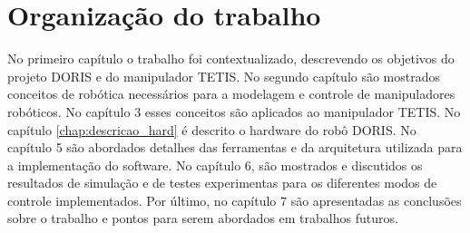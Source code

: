 \section{Organização do trabalho}

No primeiro capítulo o trabalho foi contextualizado, descrevendo os objetivos do projeto DORIS e do manipulador TETIS. No segundo capítulo são mostrados conceitos de robótica necessários para a modelagem e controle de manipuladores robóticos. No capítulo 3 esses conceitos são aplicados ao manipulador TETIS.
No capítulo \ref{chap:descricao_hard} é descrito o hardware do robô DORIS.  No capítulo 5 são abordados detalhes das ferramentas e da arquitetura utilizada para a implementação do software. No capítulo 6, são mostrados e discutidos os resultados de simulação e de testes experimentas para os diferentes modos de controle implementados.  Por último, no capítulo 7 são apresentadas as conclusões sobre o trabalho e pontos para serem abordados em trabalhos futuros.


